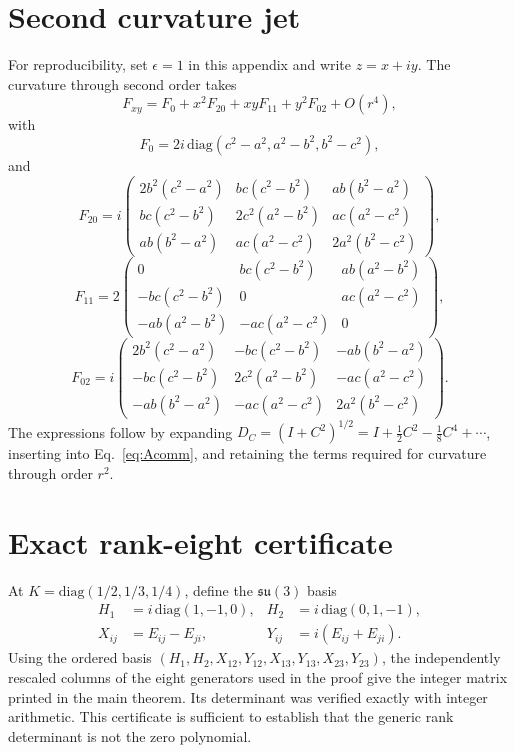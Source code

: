 \documentclass[11pt]{article}
\theoremstyle{remark}\newtheorem{remark}{Remark}
\begin{document}
\section{Second curvature jet}
For reproducibility, set $\epsilon=1$ in this appendix and write $z=x+iy$. The curvature through second order takes
\begin{equation}
F_{xy}=F_0+x^2F_{20}+xyF_{11}+y^2F_{02}+O(r^4),
\end{equation}
with
\begin{equation}
F_0=2i\,\mathrm{diag}(c^2-a^2,a^2-b^2,b^2-c^2),
\end{equation}
and
\begin{equation}
F_{20}=i\begin{pmatrix}
2b^2(c^2-a^2)&bc(c^2-b^2)&ab(b^2-a^2)\\
bc(c^2-b^2)&2c^2(a^2-b^2)&ac(a^2-c^2)\\
ab(b^2-a^2)&ac(a^2-c^2)&2a^2(b^2-c^2)
\end{pmatrix},
\end{equation}
\begin{equation}
F_{11}=2\begin{pmatrix}
0&bc(c^2-b^2)&ab(a^2-b^2)\\
-bc(c^2-b^2)&0&ac(a^2-c^2)\\
-ab(a^2-b^2)&-ac(a^2-c^2)&0
\end{pmatrix},
\end{equation}
\begin{equation}
F_{02}=i\begin{pmatrix}
2b^2(c^2-a^2)&-bc(c^2-b^2)&-ab(b^2-a^2)\\
-bc(c^2-b^2)&2c^2(a^2-b^2)&-ac(a^2-c^2)\\
-ab(b^2-a^2)&-ac(a^2-c^2)&2a^2(b^2-c^2)
\end{pmatrix}.
\end{equation}
The expressions follow by expanding $D_C=(I+C^2)^{1/2}=I+\tfrac12C^2-\tfrac18C^4+\cdots$, inserting into Eq.~\eqref{eq:Acomm}, and retaining the terms required for curvature through order $r^2$.

\section{Exact rank-eight certificate}
At $K=\mathrm{diag}(1/2,1/3,1/4)$, define the $\mathfrak{su}(3)$ basis
\begin{align}
H_1&=i\,\mathrm{diag}(1,-1,0),& H_2&=i\,\mathrm{diag}(0,1,-1),\\
X_{ij}&=E_{ij}-E_{ji},&Y_{ij}&=i(E_{ij}+E_{ji}).
\end{align}
Using the ordered basis $(H_1,H_2,X_{12},Y_{12},X_{13},Y_{13},X_{23},Y_{23})$, the independently rescaled columns of the eight generators used in the proof give the integer matrix printed in the main theorem. Its determinant was verified exactly with integer arithmetic. This certificate is sufficient to establish that the generic rank determinant is not the zero polynomial.
\end{document}
